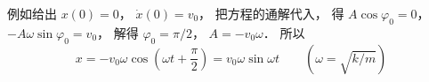 例如给出 $x(0) = 0$，  $\dot x(0) = v_0$， 把方程的通解代入， 得 $A\cos \varphi_0 = 0$，  $ - A\omega \sin \varphi _0 = v_0$， 解得 $\varphi _0 = \pi /2$，  $A =  -v_0\omega $． 所以
\begin{equation}
x =  - v_0\omega \cos (\omega t + \frac{\pi }{2}) = v_0\omega \sin \omega t \qquad (\omega  = \sqrt{k/m})
\end{equation}



















